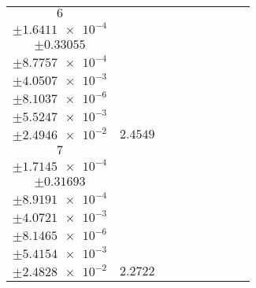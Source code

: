 \documentclass[8pt]{article}
\begin{document}
\begin{longtable}[l]{c c c c c c c c c}
$\num{6}$ & \begin{tabular}[c]{@{}c@{}}$\num{3.0453e-2}$ \\ $\pm\num{1.6411e-4}$\end{tabular} & \begin{tabular}[c]{@{}c@{}}$\num{0.55268}$ \\ $\pm\num{0.33055}$\end{tabular} & \begin{tabular}[c]{@{}c@{}}$\num{6.9453}$ \\ $\pm\num{8.7757e-4}$\end{tabular} & \begin{tabular}[c]{@{}c@{}}$\num{737.59}$ \\ $\pm\num{4.0507e-3}$\end{tabular} & \begin{tabular}[c]{@{}c@{}}$\num{1.4756}$ \\ $\pm\num{8.1037e-6}$\end{tabular} & \begin{tabular}[c]{@{}c@{}}$\num{1.1822}$ \\ $\pm\num{5.5247e-3}$\end{tabular} & \begin{tabular}[c]{@{}c@{}}$\num{4.0044}$ \\ $\pm\num{2.4946e-2}$\end{tabular} & $\num{2.4549}$\\
$\num{7}$ & \begin{tabular}[c]{@{}c@{}}$\num{3.0372e-2}$ \\ $\pm\num{1.7145e-4}$\end{tabular} & \begin{tabular}[c]{@{}c@{}}$\num{0.45466}$ \\ $\pm\num{0.31693}$\end{tabular} & \begin{tabular}[c]{@{}c@{}}$\num{7.4044}$ \\ $\pm\num{8.9191e-4}$\end{tabular} & \begin{tabular}[c]{@{}c@{}}$\num{738.08}$ \\ $\pm\num{4.0721e-3}$\end{tabular} & \begin{tabular}[c]{@{}c@{}}$\num{1.4766}$ \\ $\pm\num{8.1465e-6}$\end{tabular} & \begin{tabular}[c]{@{}c@{}}$\num{1.1792}$ \\ $\pm\num{5.4154e-3}$\end{tabular} & \begin{tabular}[c]{@{}c@{}}$\num{3.9902}$ \\ $\pm\num{2.4828e-2}$\end{tabular} & $\num{2.2722}$\\

\end{longtable}
\end{document}
